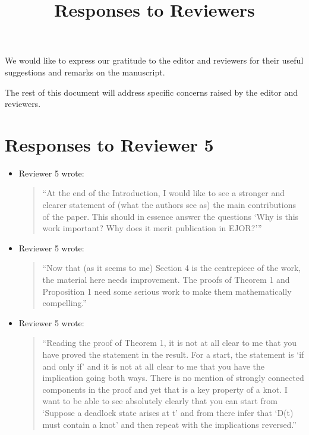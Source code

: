\documentclass{article}
\title{Responses to Reviewers}
\author{}
\date{}
\begin{document}
\maketitle

We would like to express our gratitude to the editor and reviewers for their
useful suggestions and remarks on the manuscript.

The rest of this document will address specific concerns raised by the editor
and reviewers.

\section*{Responses to Reviewer 5}

\begin{itemize}

\item Reviewer 5 wrote:
\begin{quote}
``At the end of the Introduction, I would like to see a stronger and clearer statement of (what the authors see as) the main contributions of the paper. This should in essence answer the questions ‘Why is this work important? Why does it merit publication in EJOR?’''
\end{quote}

\item Reviewer 5 wrote:
\begin{quote}
``Now that (as it seems to me) Section 4 is the centrepiece of the work, the material here needs improvement. The proofs of Theorem 1 and Proposition 1 need some serious work to make them mathematically compelling.''
\end{quote}


\item Reviewer 5 wrote:
\begin{quote}
``Reading the proof of Theorem 1, it is not at all clear to me that you have proved the statement in the result. For a start, the statement is ‘if and only if’ and it is not at all clear to me that you have the implication going both ways. There is no mention of strongly connected components in the proof and yet that is a key property of a knot. I want to be able to see absolutely clearly that you can start from ‘Suppose a deadlock state arises at t’ and from there infer that ‘D(t) must contain a knot’ and then repeat with the implications reversed.''
\end{quote}



\end{itemize}
\end{document}
